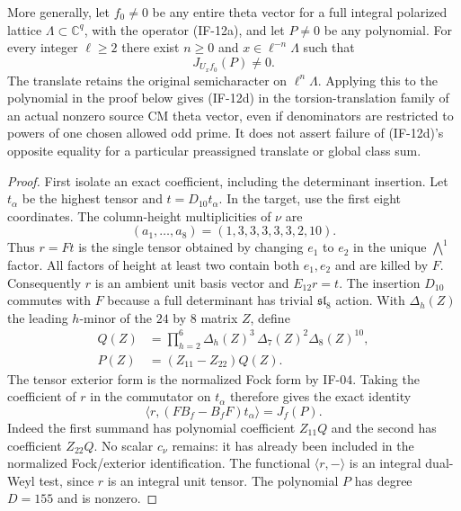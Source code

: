 \documentclass[11pt,a4paper]{article}
\theoremstyle{definition}
\theoremstyle{remark}
\begin{document}
More generally, let $f_0\ne0$ be any entire theta vector for a full
integral polarized lattice $\Lambda\subset\mathbb C^q$, with the
operator (IF-12a), and let $P\ne0$ be any polynomial. For every
integer $\ell\ge2$ there exist $n\ge0$ and
$x\in\ell^{-n}\Lambda$ such that
\[
                         J_{U_xf_0}(P)\ne0.                  \tag{IF-12e}
\]
The translate retains the original semicharacter on
$\ell^n\Lambda$. Applying this to the polynomial in the proof
below gives (IF-12d) in the torsion-translation family of an actual
nonzero source CM theta vector, even if denominators are restricted
to powers of one chosen allowed odd prime. It does not assert failure
of (IF-12d)'s opposite equality for a particular preassigned translate
or global class sum.

\begin{proof}
First isolate an exact coefficient, including the determinant
insertion. Let $t_\alpha$ be the highest tensor and
$t=D_{10}t_\alpha$. In the target, use the first eight coordinates.
The column-height multiplicities of $\nu$ are
\[
          (a_1,\ldots,a_8)=(1,3,3,3,3,3,2,10).
\]
Thus $r=Ft$ is the single tensor obtained by changing $e_1$ to
$e_2$ in the unique $\bigwedge^1$ factor. All factors of height
at least two contain both $e_1,e_2$ and are killed by $F$.
Consequently $r$ is an ambient unit basis vector and $E_{12}r=t$.
The insertion $D_{10}$ commutes with $F$ because a full determinant
has trivial $\mathfrak{sl}_8$ action. With $\Delta_h(Z)$ the leading
$h$-minor of the $24$ by $8$ matrix $Z$, define
\[
 \begin{split}
 Q(Z)&=\prod_{h=2}^{6}\Delta_h(Z)^3\,
                         \Delta_7(Z)^2\Delta_8(Z)^{10},\\
 P(Z)&=(Z_{11}-Z_{22})Q(Z).
 \end{split}                                                  \tag{IF-12f}
\]
The tensor exterior form is the normalized Fock form by IF-04.
Taking the coefficient of $r$ in the commutator on $t_\alpha$
therefore gives the exact identity
\[
       \langle r,(F B_f-B_fF)t_\alpha\rangle=J_f(P).            \tag{IF-12g}
\]
Indeed the first summand has polynomial coefficient $Z_{11}Q$ and
the second has coefficient $Z_{22}Q$. No scalar $c_\nu$ remains:
it has already been included in the normalized Fock/exterior
identification. The functional $\langle r,-\rangle$ is an integral
dual-Weyl test, since $r$ is an integral unit tensor. The polynomial
$P$ has degree $D=155$ and is nonzero.


\end{proof}
\end{document}
